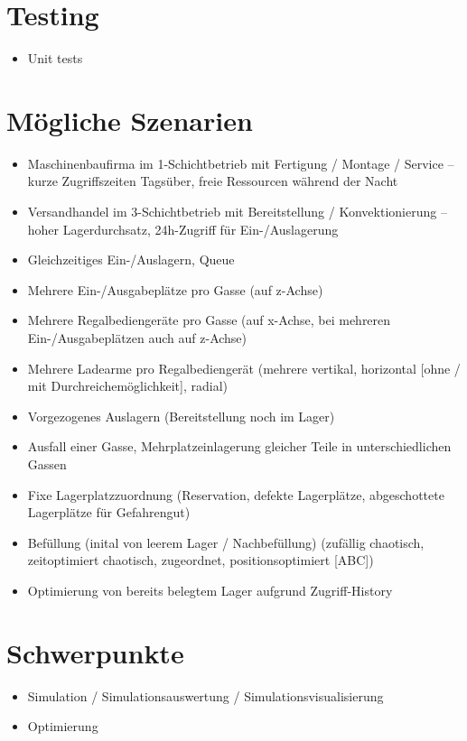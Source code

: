 \documentclass[11pt,a4paper]{article}
\begin{document}
\section{Testing}
\begin{itemize}
  \item Unit tests
\end{itemize}
%
\section{Mögliche Szenarien}
%
\begin{itemize}
  \item Maschinenbaufirma im 1-Schichtbetrieb mit Fertigung / Montage / Service -- kurze Zugriffszeiten Tagsüber, freie Ressourcen während der Nacht
  \item Versandhandel im 3-Schichtbetrieb mit Bereitstellung / Konvektionierung --  hoher Lagerdurchsatz, 24h-Zugriff für Ein-/Auslagerung
  \item Gleichzeitiges Ein-/Auslagern, Queue
  \item Mehrere Ein-/Ausgabeplätze pro Gasse (auf z-Achse)
  \item Mehrere Regalbediengeräte pro Gasse (auf x-Achse, bei mehreren Ein-/Ausgabeplätzen auch auf z-Achse)
  \item Mehrere Ladearme pro Regalbediengerät (mehrere vertikal, horizontal [ohne / mit Durchreichemöglichkeit], radial)
  \item Vorgezogenes Auslagern (Bereitstellung noch im Lager)
  \item Ausfall einer Gasse, Mehrplatzeinlagerung gleicher Teile in unterschiedlichen Gassen
  \item Fixe Lagerplatzzuordnung (Reservation, defekte Lagerplätze, abgeschottete Lagerplätze für Gefahrengut)
  \item Befüllung (inital von leerem Lager / Nachbefüllung) (zufällig chaotisch, zeitoptimiert chaotisch, zugeordnet, positionsoptimiert [ABC])
  \item Optimierung von bereits belegtem Lager aufgrund Zugriff-History
\end{itemize}
%
\section{Schwerpunkte}
\begin{itemize}
  \item Simulation / Simulationsauswertung / Simulationsvisualisierung
  \item Optimierung
\end{itemize}
%
\end{document}
